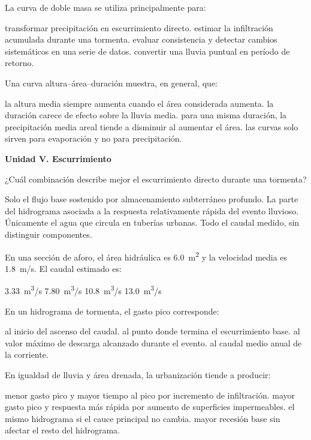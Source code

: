 \question [4] La curva de doble masa se utiliza principalmente para:
\begin{choices}
\choice transformar precipitación en escurrimiento directo.
\choice estimar la infiltración acumulada durante una tormenta.
\CorrectChoice evaluar consistencia y detectar cambios sistemáticos en una serie de datos.
\choice convertir una lluvia puntual en período de retorno.
\end{choices}

\question [4] Una curva altura--área--duración muestra, en general, que:
\begin{choices}
\choice la altura media siempre aumenta cuando el área considerada aumenta.
\choice la duración carece de efecto sobre la lluvia media.
\CorrectChoice para una misma duración, la precipitación media areal tiende a disminuir al aumentar el área.
\choice las curvas solo sirven para evaporación y no para precipitación.
\end{choices}

\item[]\textbf{Unidad V. Escurrimiento}\par\medskip

\question [5] ¿Cuál combinación describe mejor el escurrimiento directo durante una tormenta?
\begin{choices}
\choice Solo el flujo base sostenido por almacenamiento subterráneo profundo.
\CorrectChoice La parte del hidrograma asociada a la respuesta relativamente rápida del evento lluvioso.
\choice Únicamente el agua que circula en tuberías urbanas.
\choice Todo el caudal medido, sin distinguir componentes.
\end{choices}

\question [5] En una sección de aforo, el área hidráulica es \SI{6.0}{m^2} y la velocidad media es \SI{1.8}{m/s}. El caudal estimado es:
\begin{choices}
\choice \SI{3.33}{m^3/s}
\choice \SI{7.80}{m^3/s}
\CorrectChoice \SI{10.8}{m^3/s}
\choice \SI{13.0}{m^3/s}
\end{choices}

\question [5] En un hidrograma de tormenta, el gasto pico corresponde:
\begin{choices}
\choice al inicio del ascenso del caudal.
\choice al punto donde termina el escurrimiento base.
\CorrectChoice al valor máximo de descarga alcanzado durante el evento.
\choice al caudal medio anual de la corriente.
\end{choices}

\question [5] En igualdad de lluvia y área drenada, la urbanización tiende a producir:
\begin{choices}
\choice menor gasto pico y mayor tiempo al pico por incremento de infiltración.
\CorrectChoice mayor gasto pico y respuesta más rápida por aumento de superficies impermeables.
\choice el mismo hidrograma si el cauce principal no cambia.
\choice mayor recesión base sin afectar el resto del hidrograma.
\end{choices}

